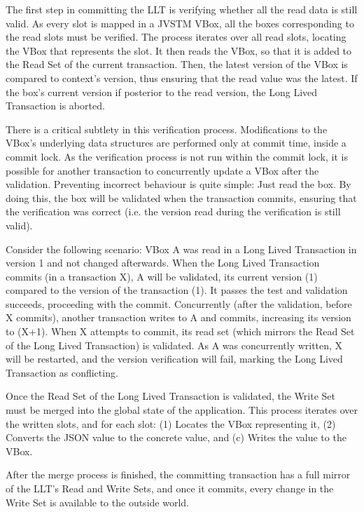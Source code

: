 \documentclass{llncs}
\begin{document}
The first step in committing the LLT is verifying whether all the read
data is still valid. As every slot is mapped in a JVSTM VBox, all the
boxes corresponding to the read slots must be verified. The process
iterates over all read slots, locating the VBox that represents the
slot. It then reads the VBox, so that it is added to the Read Set of
the current transaction. Then, the latest version of the VBox is
compared to context's version, thus ensuring that the read value was
the latest. If the box's current version if posterior to the read
version, the Long Lived Transaction is aborted.

There is a critical subtlety in this verification
process. Modifications to the VBox's underlying data structures are
performed only at commit time, inside a commit lock. As the
verification process is not run within the commit lock, it is possible
for another transaction to concurrently update a VBox after the
validation. Preventing incorrect behaviour is quite simple: Just read
the box. By doing this, the box will be validated when the transaction
commits, ensuring that the verification was correct (i.e. the version
read during the verification is still valid).

Consider the following scenario: VBox A was read in a Long Lived
Transaction in version 1 and not changed afterwards. When the Long
Lived Transaction commits (in a transaction X), A will be validated,
its current version (1) compared to the version of the transaction
(1). It passes the test and validation succeeds, proceeding with the
commit. Concurrently (after the validation, before X commits), another
transaction writes to A and commits, increasing its version to (X+1). When
X attempts to commit, its read set (which mirrors the Read Set of the
Long Lived Transaction) is validated. As A was concurrently written, X
will be restarted, and the version verification will fail, marking the
Long Lived Transaction as conflicting.

Once the Read Set of the Long Lived Transaction is validated, the
Write Set must be merged into the global state of the
application. This process iterates over the written slots, and for
each slot: (1) Locates the VBox representing it, (2) Converts the JSON
value to the concrete value, and (c) Writes the value to the VBox.

After the merge process is finished, the committing transaction has a
full mirror of the LLT's Read and Write Sets, and once it commits,
every change in the Write Set is available to the outside world.
\end{document}
